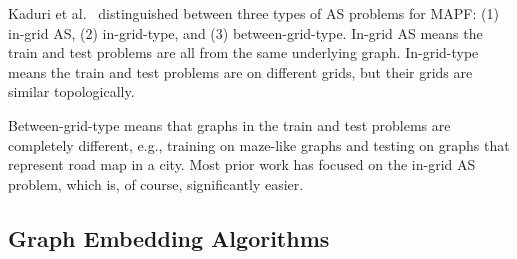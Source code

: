 \documentclass{ecai}
\newcommand{\Carmel}[1]{}
\newcommand{\Roni}[1]{}
\begin{document}


Kaduri et al.~\cite{kaduri2021experimental} distinguished between three types of AS problems for MAPF: 
(1) in-grid AS, (2) in-grid-type, and (3) between-grid-type. 
In-grid AS means the train and test problems are all from the same underlying graph. 
In-grid-type means the train and test problems are on different grids, but their grids are similar topologically. 
\Carmel{more accurate - In-grid-type means the train and test problems are from the same grid types but totally different maps}
\Roni{I rephrased}
Between-grid-type means that graphs in the train and test problems are completely different, e.g., training on maze-like graphs and testing on graphs that represent road map in a city. Most prior work has focused on the in-grid AS problem, which is, of course, significantly easier. 










\subsection{Graph Embedding Algorithms}
\end{document}
